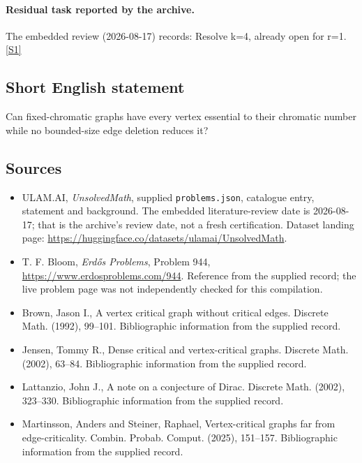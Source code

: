 \documentclass[11pt,a4paper]{article}
\newcommand{\sref}[2]{\hyperlink{source:#1:#2}{[S#2]}}
\begin{document}
\paragraph{Residual task reported by the archive.}

The embedded review (2026-08-17) records: Resolve k=4, already open for r=1. \sref{statement}{1}

\subsection{Short English statement}

Can fixed-chromatic graphs have every vertex essential to their chromatic number while no bounded-size edge deletion reduces it?

\subsection{Sources}

{\small

\begin{itemize}

\item[\hypertarget{source:statement:1}{S1}] ULAM.AI, \emph{UnsolvedMath}, supplied \texttt{problems.json}, catalogue entry, statement and background. The embedded literature-review date is 2026-08-17; that is the archive’s review date, not a fresh certification. Dataset landing page: \url{https://huggingface.co/datasets/ulamai/UnsolvedMath}.

\item[\hypertarget{source:statement:2}{S2}] T. F. Bloom, \emph{Erdős Problems}, Problem 944, \url{https://www.erdosproblems.com/944}. Reference from the supplied record; the live problem page was not independently checked for this compilation.

\item[\hypertarget{source:statement:3}{S3}] Brown, Jason I., A vertex critical graph without critical edges. Discrete Math. (1992), 99--101. Bibliographic information from the supplied record.

\item[\hypertarget{source:statement:4}{S4}] Jensen, Tommy R., Dense critical and vertex-critical graphs. Discrete Math. (2002), 63--84. Bibliographic information from the supplied record.

\item[\hypertarget{source:statement:5}{S5}] Lattanzio, John J., A note on a conjecture of {D}irac. Discrete Math. (2002), 323--330. Bibliographic information from the supplied record.

\item[\hypertarget{source:statement:6}{S6}] Martinsson, Anders and Steiner, Raphael, Vertex-critical graphs far from edge-criticality. Combin. Probab. Comput. (2025), 151--157. Bibliographic information from the supplied record.

\end{itemize}

}

\label{end:statement}
\end{document}
